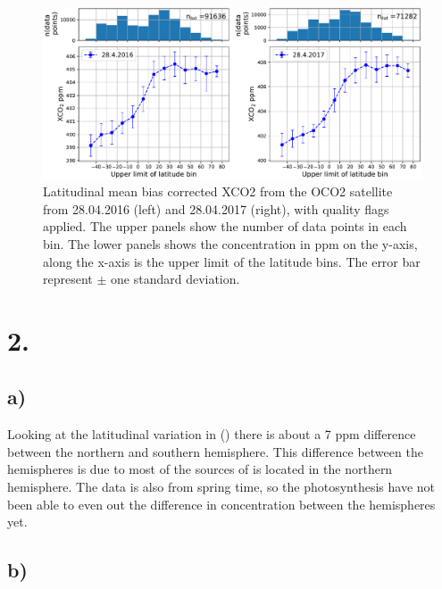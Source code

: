 \begin{figure}[htbp]
    \centering
    \includegraphics[width=\textwidth]{../qa_xCO2.pdf}
    \caption{Latitudinal mean bias corrected XCO2 from the OCO2 satellite from 28.04.2016 (left) 
    and 28.04.2017 (right), with quality flags applied. The upper panels 
    show the number of data points in each bin. The lower panels shows the  
    concentration in ppm on the y-axis, along the x-axis is the upper limit of
    the latitude bins. The error bar represent $\pm$ one standard deviation.}
    \label{fig:qa_xco2}

\end{figure}


\section*{2.}

\subsection*{a)}

Looking at the latitudinal variation in  () there is about a 7 ppm
difference between the northern and southern hemisphere. This difference between
the hemispheres is due to most of the sources of  is located in the
northern hemisphere. The data is also from spring time, so the photosynthesis
have not been able to even out the difference in  concentration between
the hemispheres yet. 

\subsection*{b)}

